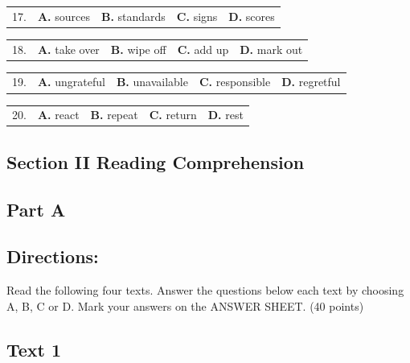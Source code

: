 \documentclass[UTF8,11pt]{ctexart}
\begin{document}
\noindent\begin{tabularx}{\linewidth}{@{}lXXXX@{}}17. & \textbf{A.} sources & \textbf{B.} standards & \textbf{C.} signs & \textbf{D.} scores\\\end{tabularx}\par

\noindent\begin{tabularx}{\linewidth}{@{}lXXXX@{}}18. & \textbf{A.} take over & \textbf{B.} wipe off & \textbf{C.} add up & \textbf{D.} mark out\\\end{tabularx}\par

\noindent\begin{tabularx}{\linewidth}{@{}lXXXX@{}}19. & \textbf{A.} ungrateful & \textbf{B.} unavailable & \textbf{C.} responsible & \textbf{D.} regretful\\\end{tabularx}\par

\noindent\begin{tabularx}{\linewidth}{@{}lXXXX@{}}20. & \textbf{A.} react & \textbf{B.} repeat & \textbf{C.} return & \textbf{D.} rest\\\end{tabularx}\par

\subsection*{\textbf{Section II Reading Comprehension}}


\subsection*{\textbf{Part A}}


\subsection*{\textbf{Directions:}}


Read the following four texts. Answer the questions below each text by choosing A, B, C or D. Mark your answers on the ANSWER SHEET. (40 points)


\subsection*{\textbf{Text 1}}
\end{document}
